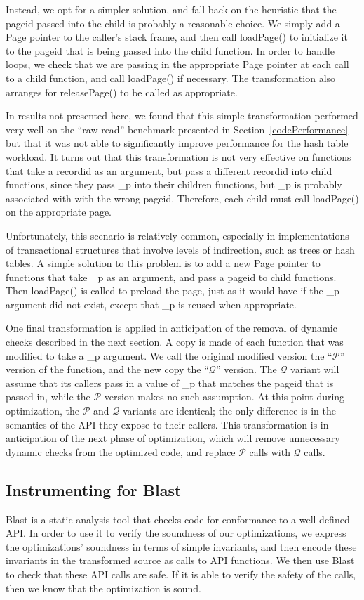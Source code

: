 \documentclass[10pt,letterpaper,twocolumn,english]{article}
\newcommand{\pin}{loadPage()\xspace}
\newcommand{\unpin}{releasePage()\xspace}
\newcommand{\PP}{\_p\xspace}
\newcommand{\fP}{{$\mathcal P$}\xspace}
\newcommand{\fQ}{{$\mathcal Q$}\xspace}
\begin{document}
Instead, we opt for a simpler solution, and fall back on the heuristic
that the pageid passed into the child is probably a reasonable choice.
We simply add a Page pointer to the caller's stack frame, and then
call \pin to initialize it to the pageid that is being passed into the
child function.  In order to handle loops, we check that we are
passing in the appropriate Page pointer at each call to a child
function, and call \pin if necessary.  The
transformation also arranges for \unpin to be called as appropriate.

In results not presented here, we found that this simple
transformation performed very well on the ``raw read'' benchmark
presented in Section~\ref{codePerformance} but that it was not able to
significantly improve performance for the hash table workload.  It
turns out that this transformation is not very effective on functions
that take a recordid as an argument, but pass a different recordid
into child functions, since they pass \PP into their children
functions, but \PP is probably associated with with the wrong pageid.
Therefore, each child must call \pin on the appropriate page. 

Unfortunately, this scenario is relatively common, especially in
implementations of transactional structures that involve levels of
indirection, such as trees or hash tables.  A simple solution to this
problem is to add a new Page pointer to functions that take \PP as an
argument, and pass a pageid to child functions.  Then \pin is called
to preload the page, just as it would have if the \PP argument
did not exist, except that \PP is reused when appropriate.

One final transformation is applied in anticipation of the removal of
dynamic checks described in the next section.  A copy is made of each
function that was modified to take a \PP argument.  We call the
original modified version the ``\fP'' version of the function, and the
new copy the ``\fQ'' version.  The \fQ variant will assume that its callers
pass in a value of \PP that matches the pageid that is passed in, while the \fP version makes no such assumption.
At this point during optimization, the \fP and \fQ variants are
identical; the only difference is in the semantics of the API they
expose to their callers.  This transformation is in anticipation of
the next phase of optimization, which will remove unnecessary dynamic
checks from the optimized code, and replace \fP calls with \fQ calls.

\subsection{Instrumenting for Blast}
\label{instrumenting}
Blast is a static analysis tool that checks code for conformance to a
well defined API.  In order to use it to verify the soundness of our
optimizations, we express the optimizations' soundness in terms of
simple invariants, and then encode these invariants in the transformed
source as calls to API functions.  We then use Blast to check that
these API calls are safe.  If it is able to verify the safety of the
calls, then we know that the optimization is sound.  
\end{document}
